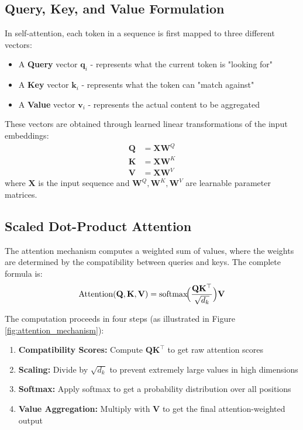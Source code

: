 \subsection{Query, Key, and Value Formulation}
\noindent
In self-attention, each token in a sequence is first mapped to three different vectors:
\begin{itemize}
    \item A \textbf{Query} vector $\mathbf{q}_i$ - represents what the current token is "looking for"
    \item A \textbf{Key} vector $\mathbf{k}_i$ - represents what the token can "match against"
    \item A \textbf{Value} vector $\mathbf{v}_i$ - represents the actual content to be aggregated
\end{itemize}
These vectors are obtained through learned linear transformations of the input embeddings:
\begin{align*}
    \mathbf{Q} &= \mathbf{X}\mathbf{W}^Q \\
    \mathbf{K} &= \mathbf{X}\mathbf{W}^K \\
    \mathbf{V} &= \mathbf{X}\mathbf{W}^V
\end{align*}
where $\mathbf{X}$ is the input sequence and $\mathbf{W}^Q, \mathbf{W}^K, \mathbf{W}^V$ are learnable parameter matrices.

\subsection{Scaled Dot-Product Attention}
\noindent
The attention mechanism computes a weighted sum of values, where the weights are determined by the compatibility between queries and keys. The complete formula is:
\[
\text{Attention}(\mathbf{Q}, \mathbf{K}, \mathbf{V}) 
= \text{softmax}\!\Bigl(\frac{\mathbf{Q} \mathbf{K}^\top}{\sqrt{d_k}}\Bigr) \mathbf{V}
\]

The computation proceeds in four steps (as illustrated in Figure \ref{fig:attention_mechanism}):
\begin{enumerate}
    \item \textbf{Compatibility Scores:} Compute $\mathbf{Q}\mathbf{K}^\top$ to get raw attention scores
    \item \textbf{Scaling:} Divide by $\sqrt{d_k}$ to prevent extremely large values in high dimensions
    \item \textbf{Softmax:} Apply softmax to get a probability distribution over all positions
    \item \textbf{Value Aggregation:} Multiply with $\mathbf{V}$ to get the final attention-weighted output
\end{enumerate}

